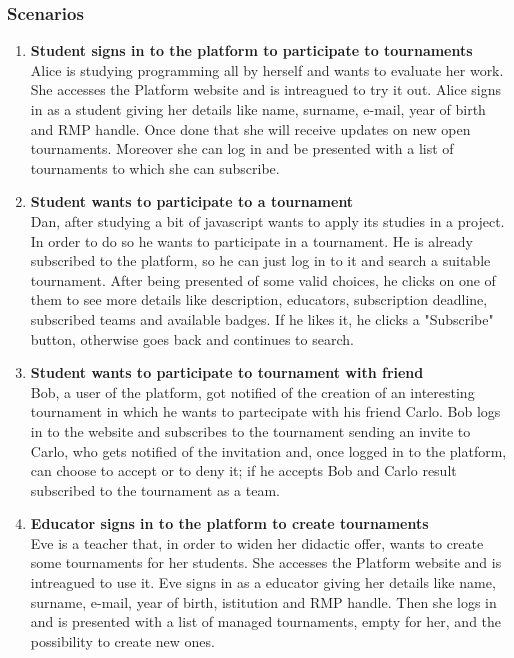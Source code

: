 \subsubsection{Scenarios}
\begin{enumerate}[label=$\bullet$ \textbf{SC\arabic*:}]
    \item \textbf{Student signs in to the platform to participate to tournaments}\\ Alice is studying programming all by herself and wants to evaluate her work. She accesses the Platform website and is intreagued to try it out. Alice signs in as a student giving her details like name, surname, e-mail,  year of birth and RMP handle. Once done that she will receive updates on new open tournaments. Moreover she can log in and be presented with a list of tournaments to which she can subscribe.
    \item \textbf{Student wants to participate to a tournament}\\ Dan, after studying a bit of javascript wants to apply its studies in a project. In order to do so he wants to participate in a tournament. He is already subscribed to the platform, so he can just log in to it and search a suitable tournament. After being presented of some valid choices, he clicks on one of them to see more details like description, educators, subscription deadline, subscribed teams and available badges. If he likes it, he clicks a "Subscribe" button, otherwise goes back and continues to search.
    \item \textbf{Student wants to participate to tournament with friend}\\ Bob, a user of the platform, got notified of the creation of an interesting tournament in which he wants to partecipate with his friend Carlo. Bob logs in to the website and subscribes to the tournament sending an invite to Carlo, who gets notified of the invitation and, once logged in to the platform, can choose to accept or to deny it; if he accepts Bob and Carlo result subscribed to the tournament as a team.
    \item \textbf{Educator signs in to the platform to create tournaments}\\ Eve is a teacher that, in order to widen her didactic offer, wants to create some tournaments for her students. She accesses the Platform website and is intreagued to use it. Eve signs in as a educator giving her details like name, surname, e-mail, year of birth, istitution and RMP handle. Then she logs in and is presented with a list of managed tournaments, empty for her, and the possibility to create new ones.

\end{enumerate}
